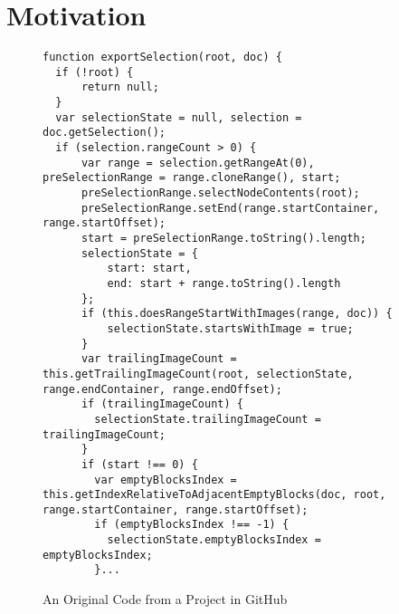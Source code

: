 \section{Motivation}
\label{example_section}



\begin{figure}[t]
	\centering
	\begin{lstlisting}[]
function exportSelection(root, doc) {
  if (!root) {
      return null;
  }
  var selectionState = null, selection = doc.getSelection();
  if (selection.rangeCount > 0) {
      var range = selection.getRangeAt(0), preSelectionRange = range.cloneRange(), start;
      preSelectionRange.selectNodeContents(root);
      preSelectionRange.setEnd(range.startContainer, range.startOffset);
      start = preSelectionRange.toString().length;
      selectionState = {
          start: start,
          end: start + range.toString().length
      };
      if (this.doesRangeStartWithImages(range, doc)) {
          selectionState.startsWithImage = true;
      }
      var trailingImageCount = this.getTrailingImageCount(root, selectionState, range.endContainer, range.endOffset);
      if (trailingImageCount) {
        selectionState.trailingImageCount = trailingImageCount;
      }
      if (start !== 0) {
        var emptyBlocksIndex = this.getIndexRelativeToAdjacentEmptyBlocks(doc, root, range.startContainer, range.startOffset);
        if (emptyBlocksIndex !== -1) {
          selectionState.emptyBlocksIndex = emptyBlocksIndex;
        }...
        \end{lstlisting}
\vspace{-12pt}
\caption{An Original Code from a Project in GitHub}
\label{example_org}
\end{figure}


